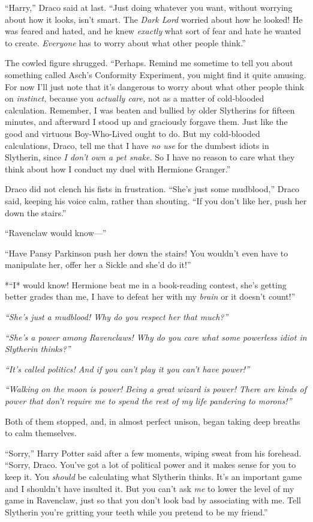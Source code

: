 ``Harry,'' Draco said at last. ``Just doing whatever you want, without
worrying about how it looks, isn't smart. The \emph{Dark Lord} worried
about how he looked! He was feared and hated, and he knew \emph{exactly}
what sort of fear and hate he wanted to create. \emph{Everyone} has to
worry about what other people think.''

The cowled figure shrugged. ``Perhaps. Remind me sometime to tell you
about something called Asch's Conformity Experiment, you might find it
quite amusing. For now I'll just note that it's dangerous to worry about
what other people think on \emph{instinct,} because you \emph{actually
care,} not as a matter of cold-blooded calculation. Remember, I was
beaten and bullied by older Slytherins for fifteen minutes, and
afterward I stood up and graciously forgave them. Just like the good and
virtuous Boy-Who-Lived ought to do. But my cold-blooded calculations,
Draco, tell me that I have \emph{no use} for the dumbest idiots in
Slytherin, since \emph{I don't own a pet snake.} So I have no reason to
care what they think about how I conduct my duel with Hermione
Granger.''

Draco did not clench his fists in frustration. ``She's just some
mudblood,'' Draco said, keeping his voice calm, rather than shouting.
``If you don't like her, push her down the stairs.''

``Ravenclaw would know---''

``Have Pansy Parkinson push her down the stairs! You wouldn't even have
to manipulate her, offer her a Sickle and she'd do it!''

*``I* would know! Hermione beat me in a book-reading contest, she's
getting better grades than me, I have to defeat her with my \emph{brain}
or it doesn't count!''

\emph{``She's just a mudblood! Why do you respect her that much?''}

\emph{``She's a power among Ravenclaws! Why do you care what some
powerless idiot in Slytherin thinks?''}

\emph{``It's called politics! And if you can't play it you can't have
power!''}

\emph{``Walking on the moon is power! Being a great wizard is power!
There are kinds of power that don't require me to spend the rest of my
life pandering to morons!''}

Both of them stopped, and, in almost perfect unison, began taking deep
breaths to calm themselves.

``Sorry,'' Harry Potter said after a few moments, wiping sweat from his
forehead. ``Sorry, Draco. You've got a lot of political power and it
makes sense for you to keep it. You \emph{should} be calculating what
Slytherin thinks. It's an important game and I shouldn't have insulted
it. But you can't ask \emph{me} to lower the level of my game in
Ravenclaw, just so that you don't look bad by associating with me. Tell
Slytherin you're gritting your teeth while you pretend to be my
friend.''

